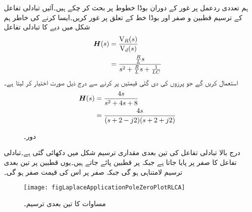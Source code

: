 ہم تعددی ردعمل پر غور کے دوران بوڈا خطوط پر بحث کر چکے ہیں۔آئیں تبادلی تفاعل کے ترسیم قطبین و صفر اور بوڈا خط کے تعلق پر غور کریں۔ایسا کرنے کی خاطر ہم شکل  میں دیے  کا تبادلی تفاعل
\begin{align*}
{\ensuremath{{\boldsymbol{H}}}}(s)&=\frac{{{\textup{V}}}_R(s)}{{{\textup{V}}}_d(s)}\\
&=\frac{\frac{R}{L} s}{s^2+\frac{R}{L}s+\frac{1}{LC}}
\end{align*}
 استعمال کریں گے جو پرزوں کی دی گئی قیمتیں پر کرنے سے درج ذیل صورت اختیار کر لیتا ہے۔
\begin{gather}
\begin{aligned}\label{مساوات_لاپلاس_استعمال_تین_بعدی_الف}
{\ensuremath{{\boldsymbol{H}}}}(s)&=\frac{4 s}{s^2+4s+8}\\
&=\frac{4s}{(s+2-j2)(s+2+j2)}
\end{aligned}
\end{gather}
%
\begin{figure}
\centering
{}
\caption{ دور۔}
\label{شکل_لاپلاس_استعمال_سلسلہ_وار_دور_قطبین_صفر}
\end{figure}

درج بالا تبادلی تفاعل کی تین بعدی مقداری ترسیم شکل  میں دکھائی گئی ہے۔تبادلی تفاعل کا صفر  پر پایا جاتا ہے جبکہ  پر قطبین پائے جاتے ہیں۔یوں قطبین پر تین بعدی ترسیم لامتناہی ہو گی جبکہ صفر پر اس کی قیمت صفر ہو گی۔
\begin{figure}
\centering
\texttt{[image: figLaplaceApplicationPoleZeroPlotRLCA]}
\caption{مساوات  کا تین بعدی ترسیم۔}
\label{شکل_لاپلاس_استعمال_تین_بعدی_ترسیم_الف}
\end{figure}

